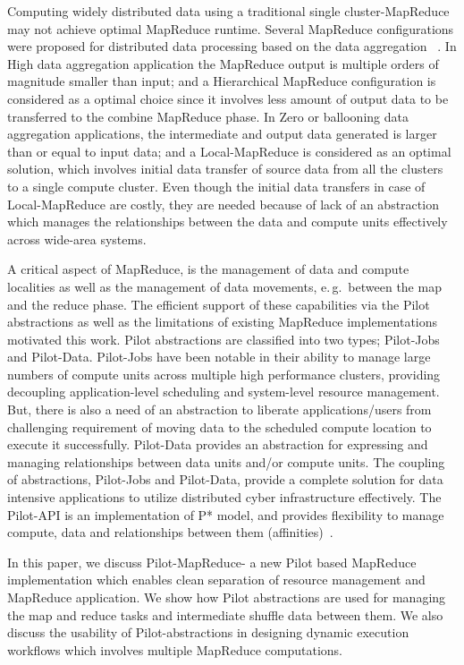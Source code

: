 \documentclass{acm_proc_article-sp}
\newcommand{\pilot}{Pilot\xspace}
\newcommand{\pilotmapreduce}{Pilot-MapReduce\xspace}
\begin{document}
Computing widely distributed data using a traditional single cluster-MapReduce may not achieve optimal MapReduce runtime. Several MapReduce configurations were proposed for distributed data processing based on the data aggregation ~\cite {weissman-mr-11}. In High data aggregation application the MapReduce output is multiple orders of magnitude smaller than input; and a Hierarchical MapReduce configuration is considered as a optimal choice since it involves less amount of output data to be transferred to the combine MapReduce phase. In Zero or ballooning data aggregation applications, the intermediate and output data generated is larger than or equal to input data; and a Local-MapReduce is considered as an optimal solution, which involves initial data transfer of source data from all the clusters to a single compute cluster. Even though the initial data transfers in case of Local-MapReduce are costly, they are needed because of lack of an abstraction which manages the relationships between the data and compute units effectively across wide-area systems. 

A critical aspect of MapReduce, is the management of data and compute localities as well as the management of data movements, e.\,g.\ between the map and the reduce phase. The efficient support of these capabilities via the Pilot abstractions as well as the limitations of existing MapReduce implementations motivated this work. Pilot abstractions are classified into two types; Pilot-Jobs and Pilot-Data. Pilot-Jobs have been notable in their ability to manage large numbers of compute units across multiple high performance clusters, providing decoupling
application-level scheduling and system-level resource management. But, there
is also a need of an abstraction to liberate applications/users from
challenging requirement of moving data to the scheduled compute location to
execute it successfully. Pilot-Data provides an abstraction for expressing and
managing relationships between data units and/or compute units. The coupling
of abstractions, Pilot-Jobs and Pilot-Data, provide a complete solution for
data intensive applications to utilize distributed cyber infrastructure
effectively. The Pilot-API is an implementation of P* model, and provides
flexibility to manage compute, data and relationships between them
(affinities)~\cite{pstar-2012}.

In this paper, we discuss \pilotmapreduce- a new \pilot based MapReduce
implementation which enables clean separation of resource
management and MapReduce application. We show
how \pilot abstractions are used for managing the map and reduce tasks and
intermediate shuffle data between them. We also discuss the usability of \pilot-abstractions
in designing dynamic execution workflows which involves multiple MapReduce computations. 
\end{document}
